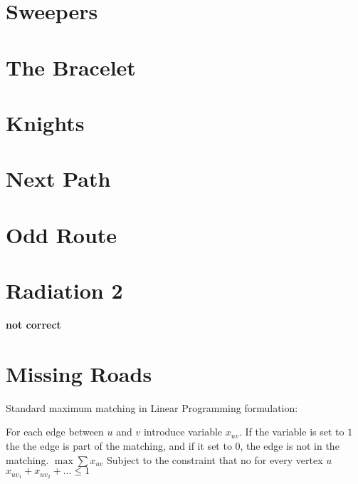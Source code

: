 \documentclass[a4paper, 10pt]{article}
\let\stdsection\section
\renewcommand\section{\newpage\stdsection}
\newcommand{\includecode}[1]{
    }
\newcommand{\algoAuthor}{2} %
\begin{document}
    \section{Sweepers}
        \label{sec:sweepers}
        \includecode{../problems/w12/Sweepers/Sweepers\algoAuthor.cpp}
        
    \section{The Bracelet}
        \label{sec:the_bracelet}
        \includecode{../problems/w12/The_Bracelet/TheBracelet\algoAuthor.cpp}
        
    
    \section{Knights}
        \label{sec:knights}
        \includecode{../problems/w13/Knights/Knights\algoAuthor.cpp}
        
    \section{Next Path}
        \label{sec:next_path}
        \includecode{../problems/w13/NextPath/NextPath\algoAuthor.cpp}
        
    \section{Odd Route}
        \label{sec:odd_route}
        \includecode{../problems/w13/OddRoute/OddRoute\algoAuthor.cpp}
        
    \section{Radiation 2}
        \textbf{not correct}

        \label{sec:radiation_2}
        \includecode{../problems/w13/Radiation2/Radiation_\algoAuthor.cpp}

    \section{Missing Roads}
        \label{sec:missing_roads}
        Standard maximum matching in Linear Programming formulation:

        For each edge between $u$ and $v$ introduce variable $x_{uv}$. If the variable is set to $1$ the the edge is part of the matching, 
        and if it set to 0, the edge is not in the matching.
        $\max \sum x_{uv}$
        Subject to the constraint that no for every vertex $u$
        $x_{uv_1} + x_{uv_2} + \dots \leq 1$
    
    
\end{document}
